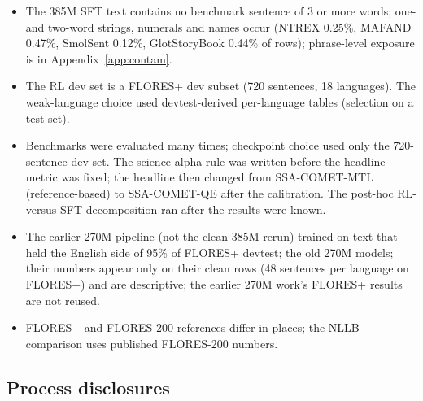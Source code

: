 \begin{itemize}
\item The 385M SFT text contains no benchmark sentence of 3 or more words; one- and two-word strings, numerals and names occur (NTREX 0.25\%, MAFAND 0.47\%, SmolSent 0.12\%, GlotStoryBook 0.44\% of rows); phrase-level exposure is in Appendix~\ref{app:contam}.
\item The RL dev set is a FLORES+ dev subset (720 sentences, 18 languages). The weak-language choice used devtest-derived per-language tables (selection on a test set).
\item Benchmarks were evaluated many times; checkpoint choice used only the 720-sentence dev set. The science alpha rule was written before the headline metric was fixed; the headline then changed from SSA-COMET-MTL (reference-based) to SSA-COMET-QE after the calibration. The post-hoc RL-versus-SFT decomposition ran after the results were known.
\item The earlier 270M pipeline (not the clean 385M rerun) trained on text that held the English side of 95\% of FLORES+ devtest; the old 270M models; their numbers appear only on their clean rows (48 sentences per language on FLORES+) and are descriptive; the earlier 270M work's FLORES+ results are not reused.
\item FLORES+ and FLORES-200 references differ in places; the NLLB comparison uses published FLORES-200 numbers.
\end{itemize}

\subsection{Process disclosures}


